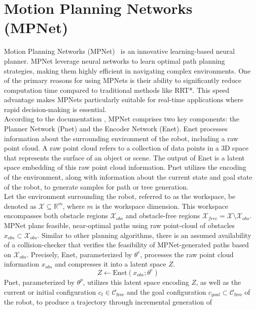 \documentclass{ctuthesis}
\begin{document}
\section{Motion Planning Networks (MPNet)}
Motion Planning Networks (MPNet)~\cite{Ahmed2019MotionPlanningNetworks} is an 
innovative learning-based neural planner.  
MPNet  leverage neural networks to learn optimal path planning strategies, 
making them highly efficient in navigating complex environments.  
One of the primary reasons for using MPNets is their ability to 
significantly reduce computation time compared to traditional methods like RRT*. 
This speed advantage makes MPNets particularly suitable for real-time applications where 
rapid decision-making is essential.
\\[12pt]
According to the documentation \cite{Ahmed2019MotionPlanningNetworks}, 
MPNet comprises two key components: the Planner Network (Pnet) and the Encoder Network (Enet). 
Enet processes information about the surrounding environment of the robot, 
including a raw point cloud. 
A raw point cloud refers to a collection of data points in a 3D space that 
represents the surface of an object or scene.
The output of Enet is a latent space embedding of this raw point cloud information. 
Pnet utilizes the encoding of the environment, 
along with information about the current state and goal state of the robot, 
to generate samples for path or tree generation.
\\[12pt]
Let the environment surrounding the robot, 
referred to as the workspace, 
be denoted as \(\mathcal{X} \subseteq \mathbb{R}^m\), where \(m\) is the workspace dimension. 
This workspace encompasses both obstacle regions \(\mathcal{X}_{obs}\) and 
obstacle-free regions \(\mathcal{X}_{free} = \mathcal{X} \setminus \mathcal{X}_{obs}\). 
MPNet plans feasible, 
near-optimal paths using raw point-cloud of obstacles \(x_{obs} \subset \mathcal{X}_{obs}\). 
Similar to other planning algorithms, 
there is an assumed availability of a collision-checker 
that verifies the feasibility of MPNet-generated paths based on \(\mathcal{X}_{obs}\).
Precisely, Enet, parameterized by \( \theta^e \), 
processes the raw point cloud information \( x_{obs} \) and 
compresses it into a latent space \(Z\). 
\[
  Z \leftarrow \text{Enet}(x_{obs}; \theta^e)
\]
Pnet, parameterized by \( \theta^p \), utilizes this latent space encoding \(Z\), 
as well as the current or initial configuration \(c_t \in \mathcal{C}_{\text{free}}\) and 
the goal configuration \(c_{goal} \subset \mathcal{C}_{\text{free}}\) of the robot, 
to produce a trajectory through incremental generation of 
\end{document}
